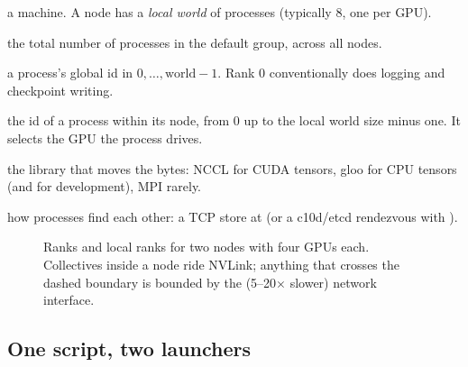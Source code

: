 \begin{description}[leftmargin=2.4cm, style=nextline]
  \item[node] a machine. A node has a \emph{local world} of processes (typically 8, one per GPU).
  \item[world size] the total number of processes in the default group, across all nodes.
  \item[rank] a process's global id in $0,\dots,\text{world}-1$. Rank 0 conventionally does
    logging and checkpoint writing.
  \item[local rank] the id of a process within its node, from 0 up to the local world size minus one.
    It selects the GPU the process drives.
  \item[backend] the library that moves the bytes: NCCL for CUDA tensors, gloo for CPU tensors
    (and for development), MPI rarely.
  \item[rendezvous] how processes find each other: a TCP store at 
    (or a c10d/etcd rendezvous with ).
\end{description}

\begin{figure}[t]
\centering
{}
\caption{Ranks and local ranks for two nodes with four GPUs each. Collectives inside a node ride
NVLink; anything that crosses the dashed boundary is bounded by the (5--20$\times$ slower) network
interface.}
\label{fig:sharding:ranks}
\end{figure}

\subsection{One script, two launchers}

